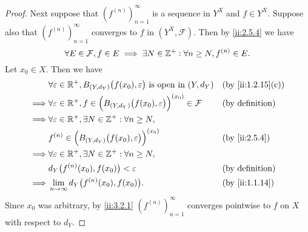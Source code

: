 \begin{proof}
  Next suppose that \((f^{(n)})_{n = 1}^\infty\) is a sequence in \(Y^X\) and \(f \in Y^X\).
  Suppose also that \((f^{(n)})_{n = 1}^\infty\) converges to \(f\) in \((Y^X, \mathcal{F})\).
  Then by \cref{ii:2.5.4} we have
  \[
    \forall E \in \mathcal{F}, f \in E \implies \exists N \in \mathbb{Z}^+ : \forall n \geq N, f^{(n)} \in E.
  \]
  Let \(x_0 \in X\).
  Then we have
  \begin{align*}
             & \forall \varepsilon \in \R^+, B_{(Y, d_Y)}\big(f(x_0), \varepsilon\big) \text{ is open in } (Y, d_Y)            &  & \by{ii:1.2.15}[c]      \\
    \implies & \forall \varepsilon \in \R^+, f \in \Big(B_{(Y, d_Y)}\big(f(x_0), \varepsilon\big)\Big)^{(x_0)} \in \mathcal{F} &  & \text{(by definition)} \\
    \implies & \forall \varepsilon \in \R^+, \exists N \in \Z^+ : \forall n \geq N,                                                                        \\
             & f^{(n)} \in \Big(B_{(Y, d_Y)}\big(f(x_0), \varepsilon\big)\Big)^{(x_0)}                                         &  & \by{ii:2.5.4}          \\
    \implies & \forall \varepsilon \in \R^+, \exists N \in \Z^+ : \forall n \geq N,                                                                        \\
             & d_Y\big(f^{(n)}(x_0), f(x_0)\big) < \varepsilon                                                                 &  & \text{(by definition)} \\
    \implies & \lim_{n \to \infty} d_Y\big(f^{(n)}(x_0), f(x_0)\big).                                                          &  & \by{ii:1.1.14}
  \end{align*}
  Since \(x_0\) was arbitrary, by \cref{ii:3.2.1} \((f^{(n)})_{n = 1}^\infty\) converges pointwise to \(f\) on \(X\) with respect to \(d_Y\).


\end{proof}
